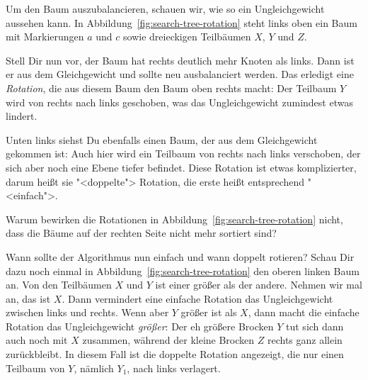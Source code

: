 Um den Baum auszubalancieren, schauen wir, wie so ein
Ungleichgewicht aussehen kann.  In
Abbildung~\ref{fig:search-tree-rotation} steht links oben ein
Baum mit Markierungen $a$ und $c$ sowie dreieckigen Teilbäumen $X$,
$Y$ und $Z$.

Stell Dir nun vor, der Baum hat rechts deutlich mehr
Knoten als links.  Dann ist er aus dem Gleichgewicht und sollte neu
ausbalanciert werden.
Das erledigt eine \textit{Rotation},
die aus diesem Baum den Baum oben rechts macht: Der
Teilbaum $Y$ wird von rechts nach links geschoben, was das Ungleichgewicht
zumindest etwas lindert.

Unten links siehst Du ebenfalls einen Baum, der aus dem Gleichgewicht
gekommen ist: Auch hier wird ein Teilbaum von rechts nach links
verschoben, der sich aber noch eine Ebene tiefer be\-findet.  Diese
Rotation ist etwas komplizierter, darum heißt sie "<doppelte">
Rotation, die erste heißt entsprechend "<einfach">.

\pagebreak[4]

\begin{aufgabeinline}
  Warum bewirken die Rotationen in
  Abbildung~\ref{fig:search-tree-rotation} nicht, dass die Bäume auf
  der rechten Seite nicht mehr sortiert sind?
\end{aufgabeinline}
%
Wann sollte der Algorithmus nun einfach und wann doppelt rotieren?
Schau Dir dazu noch einmal in Abbildung~\ref{fig:search-tree-rotation}
den oberen linken Baum an.  Von den Teilbäumen $X$ und $Y$ ist einer
größer als der andere.  Nehmen wir mal an, das ist $X$.  Dann
vermindert eine einfache Rotation das Ungleichgewicht zwischen links
und rechts.
Wenn aber $Y$ größer ist als $X$, dann macht die einfache Rotation das
Ungleichgewicht \emph{größer}: Der eh größere Brocken $Y$ tut sich
dann auch noch mit $X$ zusammen, während der kleine Brocken $Z$ rechts
ganz allein zurückbleibt.  In diesem Fall ist die doppelte Rotation
angezeigt, die nur einen Teilbaum von $Y$, nämlich $Y_1$, nach links
verlagert.

